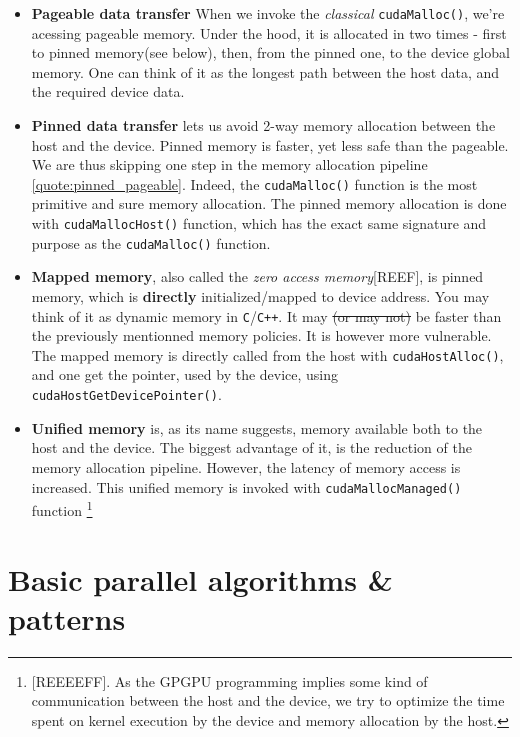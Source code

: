 \documentclass[12pt]{article}
\begin{document}
\begin{itemize}
   \setlength\itemsep{-0.5em}

   \item \textbf{Pageable data transfer} When we invoke the \textit{classical} \verb|cudaMalloc()|, 
   we're acessing pageable memory. Under the hood, it is allocated in two times - first to pinned memory(see below), 
   then, from the pinned one, to the device global memory. One can think of it as the longest path between the host data, 
   and the required device data.
   \item \textbf{Pinned data transfer} lets us avoid 2-way memory allocation between the host and the device. 
   Pinned memory is faster, yet less safe than the pageable. We are thus skipping one step in the memory allocation 
   pipeline \ref{quote:pinned_pageable}. Indeed, the \verb|cudaMalloc()| function is the most 
   primitive and sure memory allocation. The pinned memory allocation is done with \verb|cudaMallocHost()| function, 
   which has the exact same signature and purpose as the \verb|cudaMalloc()| function.
   \item \textbf{Mapped memory}, also called the \textit{zero access memory}[REEF], is pinned memory, which is \textbf{directly}
   initialized/mapped to device address. You may think of it as dynamic memory in \verb|C|/\verb|C++|. It may \sout{(or may not)} be 
   faster than the previously mentionned memory policies. It is however more vulnerable. The mapped memory is directly called from the host 
   with \verb|cudaHostAlloc()|, and one get the pointer, used by the device, using \verb|cudaHostGetDevicePointer()|.
   \item \textbf{Unified memory} is, as its name suggests, memory available both to the host and the device. The biggest advantage of it, 
   is the reduction of the memory allocation pipeline. However, the latency of memory access is increased. This unified memory 
   is invoked with \verb|cudaMallocManaged()| function \footnote{[REEEEFF]. As the GPGPU programming implies some kind of communication 
   between the host and the device, we try to optimize the time spent on kernel execution by the device and memory allocation by the host.}

   \label{mem_alloc}

\end{itemize}

\section{Basic parallel algorithms \& patterns}
\end{document}
